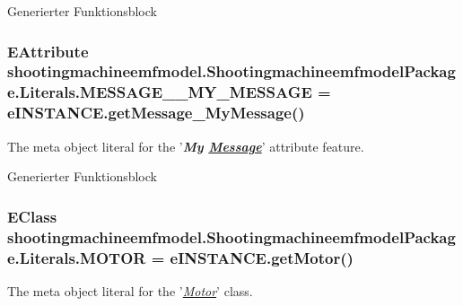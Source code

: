 Generierter Funktionsblock \hypertarget{interfaceshootingmachineemfmodel_1_1_shootingmachineemfmodel_package_1_1_literals_a78d1aca63746e19f5af0adee1d42af50}{
\subsubsection[{M\-E\-S\-S\-A\-G\-E\-\_\-\-\_\-\-M\-Y\-\_\-\-M\-E\-S\-S\-A\-G\-E}]{\setlength{\rightskip}{0pt plus 5cm}E\-Attribute shootingmachineemfmodel.\-Shootingmachineemfmodel\-Package.\-Literals.\-M\-E\-S\-S\-A\-G\-E\-\_\-\-\_\-\-M\-Y\-\_\-\-M\-E\-S\-S\-A\-G\-E = e\-I\-N\-S\-T\-A\-N\-C\-E.\-get\-Message\-\_\-\-My\-Message()}}\label{interfaceshootingmachineemfmodel_1_1_shootingmachineemfmodel_package_1_1_literals_a78d1aca63746e19f5af0adee1d42af50}
The meta object literal for the '{\itshape {\bfseries My \hyperlink{interfaceshootingmachineemfmodel_1_1_message}{Message}}}' attribute feature.

Generierter Funktionsblock \hypertarget{interfaceshootingmachineemfmodel_1_1_shootingmachineemfmodel_package_1_1_literals_a7bbdd7d8cb18d53b305d394e8c42b4b8}{
\subsubsection[{M\-O\-T\-O\-R}]{\setlength{\rightskip}{0pt plus 5cm}E\-Class shootingmachineemfmodel.\-Shootingmachineemfmodel\-Package.\-Literals.\-M\-O\-T\-O\-R = e\-I\-N\-S\-T\-A\-N\-C\-E.\-get\-Motor()}}\label{interfaceshootingmachineemfmodel_1_1_shootingmachineemfmodel_package_1_1_literals_a7bbdd7d8cb18d53b305d394e8c42b4b8}
The meta object literal for the '\hyperlink{classshootingmachineemfmodel_1_1impl_1_1_motor_impl}{{\itshape Motor}}' class.

